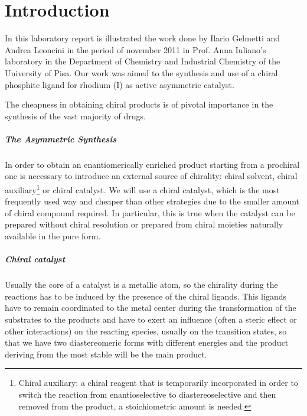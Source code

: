 




\chapter{Introduction}
In this laboratory report is illustrated the work done by Ilario Gelmetti and Andrea Leoncini in the period of november 2011 in Prof. Anna Iuliano's laboratory in the Department of Chemistry and Industrial Chemistry of the University of Pisa. Our work was aimed to the synthesis and use of a chiral phosphite ligand for rhodium (I) as active asymmetric catalyst.

The cheapness in obtaining chiral products is of pivotal importance in the synthesis of the vast majority of drugs.
\paragraph{The Asymmetric Synthesis}
In order to obtain an enantiomerically enriched product starting from a prochiral one is necessary to introduce an external source of chirality: chiral solvent, chiral auxiliary\footnote{Chiral auxiliary: a chiral reagent that is temporarily incorporated in order to switch the reaction from enantioselective to diastereoselective and then removed from the product, a stoichiometric amount is needed.} 
 or chiral catalyst. We will use a chiral catalyst, which is the most frequently used way and cheaper than other strategies due to the smaller amount of chiral compound required. In particular, this is true when the catalyst can be prepared without chiral resolution or prepared from chiral moieties naturally available in the pure form.
\paragraph{Chiral catalyst} Usually the core of a catalyst is a metallic atom, so the chirality during the reactions has to be induced by the presence of the chiral ligands. This ligands have to remain coordinated to the metal center during the transformation of the substrates to the products and have to exert an influence (often a steric effect or other interactions) on the reacting species, usually on the transition states, so that we have two diastereomeric forms with different energies and the product deriving from the most stable will be the main product.
